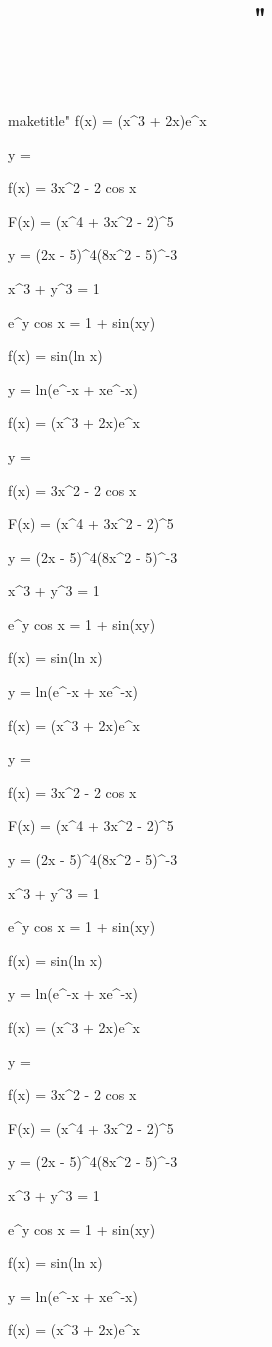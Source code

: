 \documentclass[11pt,a4paper]{article}
\title{
"}\n\n\
\begin{document}
\n\n\\maketitle\n\n"
f(x) = (x^3 + 2x)e^x

y = 

f(x) = 3x^2 - 2 cos x


 F(x) = (x^4 + 3x^2 - 2)^5

 y = (2x - 5)^4(8x^2 - 5)^{-3}

 x^3 + y^3 = 1

 e^y cos x = 1 + sin(xy)

 f(x) = sin(ln x)

 y = ln(e^{-x} + xe^{-x})

f(x) = (x^3 + 2x)e^x

y = 

f(x) = 3x^2 - 2 cos x


 F(x) = (x^4 + 3x^2 - 2)^5

 y = (2x - 5)^4(8x^2 - 5)^{-3}

 x^3 + y^3 = 1

 e^y cos x = 1 + sin(xy)

 f(x) = sin(ln x)

 y = ln(e^{-x} + xe^{-x})

f(x) = (x^3 + 2x)e^x

y = 

f(x) = 3x^2 - 2 cos x


 F(x) = (x^4 + 3x^2 - 2)^5

 y = (2x - 5)^4(8x^2 - 5)^{-3}

 x^3 + y^3 = 1

 e^y cos x = 1 + sin(xy)

 f(x) = sin(ln x)

 y = ln(e^{-x} + xe^{-x})

f(x) = (x^3 + 2x)e^x

y = 

f(x) = 3x^2 - 2 cos x


 F(x) = (x^4 + 3x^2 - 2)^5

 y = (2x - 5)^4(8x^2 - 5)^{-3}

 x^3 + y^3 = 1

 e^y cos x = 1 + sin(xy)

 f(x) = sin(ln x)

 y = ln(e^{-x} + xe^{-x})

f(x) = (x^3 + 2x)e^x
\end{document}
